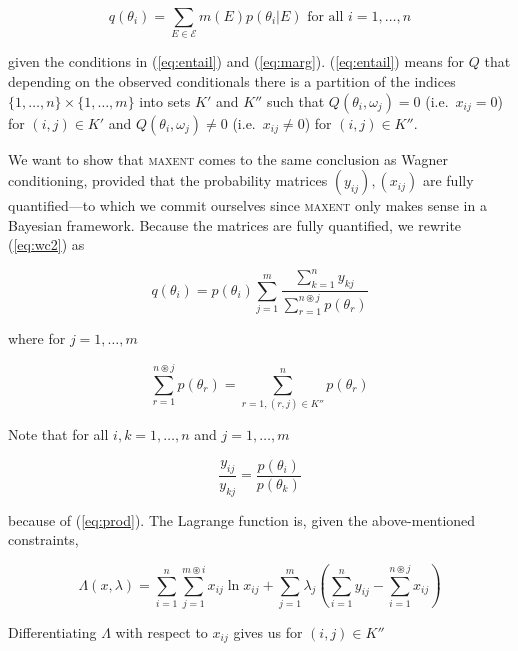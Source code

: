 \documentclass[11pt]{article}
\begin{document}
\begin{equation}
  \label{eq:wc2}
    q(\theta_{i})=\sum_{E\in\mathcal{E}}m(E)p(\theta_{i}|E)\mbox{ for
      all }i=1,\ldots,n
\end{equation}

given the conditions in (\ref{eq:entail}) and (\ref{eq:marg}).
(\ref{eq:entail}) means for $Q$ that depending on the observed
conditionals there is a partition of the indices
$\{1,\ldots,n\}\times\{1,\ldots,m\}$ into sets $K'$ and $K''$ such
that $Q(\theta_{i},\omega_{j})=0$ (i.e.\ $x_{ij}=0$) for
$(i,j)\in{}K'$ and $Q(\theta_{i},\omega_{j})\neq{}0$ (i.e.\
$x_{ij}\neq{}0$) for $(i,j)\in{}K''$.

We want to show that \textsc{maxent} comes to the same conclusion as
Wagner conditioning, provided that the probability matrices
$(y_{ij}),(x_{ij})$ are fully quantified---to which we commit
ourselves since \textsc{maxent} only makes sense in a Bayesian
framework. Because the matrices are fully quantified, we rewrite
(\ref{eq:wc2}) as

\begin{equation}
  \label{eq:wc3}
  q(\theta_{i})=p(\theta_{i})\sum_{j=1}^{m}\frac{\sum_{k=1}^{n}y_{kj}}{\sum_{r=1}^{n\circledast{}j}p(\theta_{r})}
\end{equation}

where for $j=1,\ldots,m$

\begin{equation}
  \label{eq:dast}
  \sum_{r=1}^{n\circledast{}j}p(\theta_{r})=\sum_{r=1,(r,j)\in{}K''}^{n}p(\theta_{r})
\end{equation}

Note that for all $i,k=1,\ldots,n$ and $j=1,\ldots,m$

\begin{equation}
  \label{eq:wc4}
  \frac{y_{ij}}{y_{kj}}=\frac{p(\theta_{i})}{p(\theta_{k})}
\end{equation}

because of (\ref{eq:prod}). The Lagrange function is, given the
above-mentioned constraints,

\begin{equation}
  \label{eq:wclag}
  \Lambda(x,\lambda)=\sum_{i=1}^{n}\sum_{j=1}^{m\circledast{}i}x_{ij}\ln{}x_{ij}+\sum_{j=1}^{m}\lambda_{j}\left(\sum_{i=1}^{n}y_{ij}-\sum_{i=1}^{n\circledast{}j}x_{ij}\right)
\end{equation}

Differentiating $\Lambda$ with respect to $x_{ij}$ gives us for $(i,j)\in{}K''$
\end{document}
